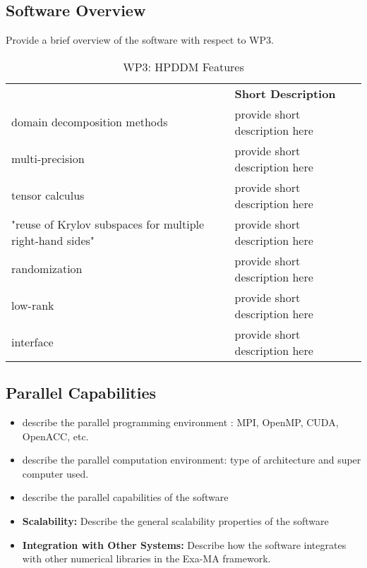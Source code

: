 \subsection{Software Overview}
\label{sec:WP3:HPDDM:summary}

Provide a brief overview of the software with respect to WP3.

\begin{table}[h!]
    \centering
    { 
        \setlength{\parindent}{0pt}
        \def\arraystretch{1.25}
        {
            \fontsize{9}{11}\selectfont
            \begin{tabular}{!{\color{numpexgray}\vrule}p{.25\linewidth}!{\color{numpexgray}\vrule}p{.6885\linewidth}!{\color{numpexgray}\vrule}}
    
     &  {\rule{0pt}{2.5ex}\color{white}\bf Short Description }\\ 
    
    domain decomposition methods & provide short description here \\
    multi-precision & provide short description here \\
    tensor calculus & provide short description here \\
    "reuse of Krylov subspaces for multiple right-hand sides" & provide short description here \\
    randomization & provide short description here \\
    low-rank & provide short description here \\
    interface & provide short description here \\
\end{tabular}
        }
    }
    \caption{WP3: HPDDM Features}
\end{table}


\subsection{Parallel Capabilities}
\label{sec:WP3:HPDDM:performances}


\begin{itemize}
    \item describe the parallel programming  environment : MPI, OpenMP, CUDA, OpenACC, etc.
    \item describe the parallel computation environment: type of architecture and super computer used.
    \item describe the parallel capabilities of the software
    \item \textbf{Scalability:} Describe the general scalability properties of the software
    \item \textbf{Integration with Other Systems:} Describe how the software integrates with other numerical libraries in the Exa-MA framework.
\end{itemize}


